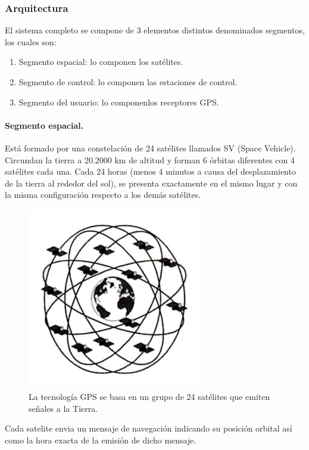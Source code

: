 \subsubsection{Arquitectura}

El sistema completo se compone de 3 elementos distintos denominados segmentos, los cuales son:

\begin{enumerate}
\item Segmento espacial: lo componen los satélites.
\item Segmento de control: lo componen las estaciones de control.
\item Segmento del usuario: lo componenlos receptores GPS.
\end{enumerate}
\newpage

\paragraph{Segmento espacial.}
 
	Está formado por una constelación de 24 satélites llamados SV (Space Vehicle). Circundan la tierra a 20.2000 km de altitud y forman 6 órbitas diferentes con 4 satélites cada una.
	Cada 24 horas (menos 4 minutos a causa del desplazamiento de la tierra al rededor del sol), se presenta exactamente en el mismo lugar y con la misma configuración respecto a los demás satélites.
	
	\begin{figure}[bp!]
	\centering
	\includegraphics[width=3in]{imgs/24satelites}
	  \caption{La tecnología GPS se basa en un grupo de 24 satélites que emiten señales a la Tierra.}
\end{figure}

	Cada satelite envia un mensaje de navegación indicando su posición orbital así como la hora exacta de la emisión de dicho mensaje.
	
